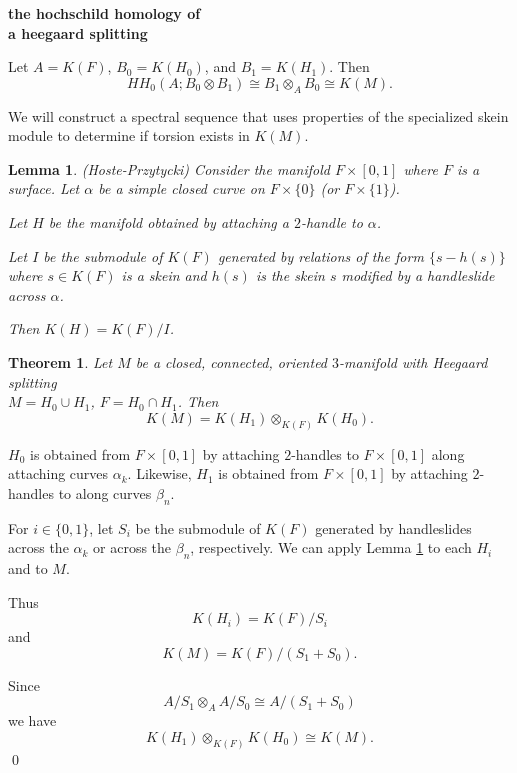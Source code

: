 \documentclass{slides}
\newcommand{\ot}{\otimes}
\newtheorem{lemma}{Lemma}
\newtheorem{theorem}{Theorem}
\theoremstyle{definition}
\begin{document}
\begin{slide}
\textbf{the hochschild homology of\\ a heegaard splitting}

Let $A=K(F)$, $B_0=K(H_0)$,
and $B_1=K(H_1)$.  Then
$$HH_0(A; B_0 \ot B_1) \cong B_1 \ot_{A} B_0 \cong K(M).$$

We will construct a spectral sequence that
uses properties of the specialized skein module to determine
if torsion exists in $K(M)$.

\end{slide}

\begin{slide}
\begin{lemma}(Hoste-Przytycki)
Consider the manifold $F \times [0,1]$ where $F$ is a surface.
Let $\alpha$ be a simple closed curve on $F \times \{ 0 \}$ (or $F \times \{ 1 \}$).

Let $H$ be the manifold obtained by attaching a $2$-handle to $\alpha$.

Let $I$ be the submodule of $K(F)$ generated by relations of the form
$\{ s - h(s) \}$ where $s \in K(F)$ is a skein and $h(s)$ is the skein $s$
modified by a handleslide across $\alpha$.

Then $K(H) = K(F)/I$.
\label{handleslide}
\end{lemma}

\end{slide}

\begin{slide}
\begin{theorem}
Let $M$ be a closed, connected, oriented $3$-manifold with Heegaard splitting
\\$M= H_0 \cup H_1$, $F = H_0 \cap H_1$.  Then
$$K(M) = K(H_1) \ot_{K(F)} K(H_0).$$
\label{kmhs}
\end{theorem}

\vspace{-1cm}
\proof
$H_0$ is obtained from
$F \times [0,1]$ by attaching $2$-handles to $F \times [0,1]$
along attaching curves $\alpha_k$.  Likewise, $H_1$ is obtained
from $F \times [0,1]$ by attaching $2$-handles to along curves $\beta_n$.

For $i \in \{0,1\}$, let $S_i$ be the submodule of $K(F)$
generated by handleslides across the $\alpha_k$ or across the $\beta_n$, respectively.
We can apply Lemma \ref{handleslide} to each $H_i$ and to $M$.
\end{slide}

\begin{slide}
Thus
$$K(H_i) = K(F)/S_i$$ and $$K(M) = K(F)/(S_1 + S_0).$$

Since $$A/S_1 \ot_A A/S_0 \cong A / (S_1 + S_0)$$ we
have
$$K(H_1) \ot_{K(F)} K(H_0) \cong K(M).$$
\qed
\end{slide}
\end{document}
